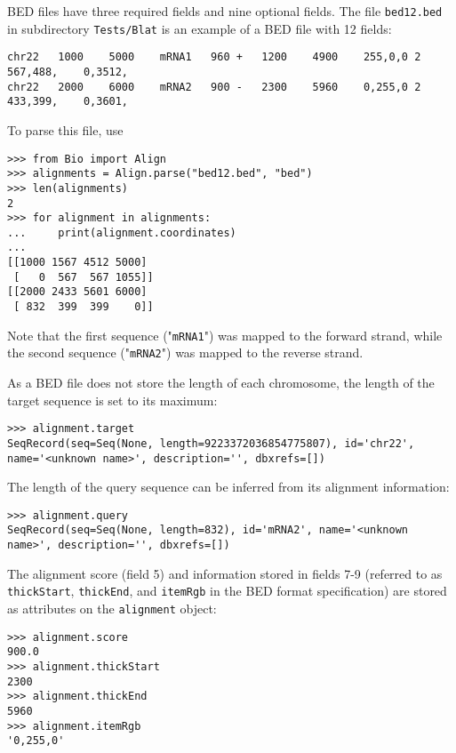 BED files have three required fields and nine optional fields. The file \verb|bed12.bed| in subdirectory \verb|Tests/Blat| is an example of a BED file with 12 fields:
\begin{verbatim}
chr22	1000	5000	mRNA1	960	+	1200	4900	255,0,0	2	567,488,	0,3512,
chr22	2000	6000	mRNA2	900	-	2300	5960	0,255,0	2	433,399,	0,3601,
\end{verbatim}
To parse this file, use
\begin{verbatim}
>>> from Bio import Align
>>> alignments = Align.parse("bed12.bed", "bed")
>>> len(alignments)
2
>>> for alignment in alignments:
...     print(alignment.coordinates)
...
[[1000 1567 4512 5000]
 [   0  567  567 1055]]
[[2000 2433 5601 6000]
 [ 832  399  399    0]]
\end{verbatim}
Note that the first sequence ("\verb|mRNA1|") was mapped to the forward strand, while the second sequence ("\verb|mRNA2|") was mapped to the reverse strand.

As a BED file does not store the length of each chromosome, the length of the target sequence is set to its maximum:
\begin{verbatim}
>>> alignment.target
SeqRecord(seq=Seq(None, length=9223372036854775807), id='chr22', name='<unknown name>', description='', dbxrefs=[])
\end{verbatim}
The length of the query sequence can be inferred from its alignment information:
\begin{verbatim}
>>> alignment.query
SeqRecord(seq=Seq(None, length=832), id='mRNA2', name='<unknown name>', description='', dbxrefs=[])
\end{verbatim}
The alignment score (field 5) and information stored in fields 7-9 (referred to as \verb|thickStart|, \verb|thickEnd|, and \verb|itemRgb| in the BED format specification) are stored as attributes on the \verb|alignment| object:
\begin{verbatim}
>>> alignment.score
900.0
>>> alignment.thickStart
2300
>>> alignment.thickEnd
5960
>>> alignment.itemRgb
'0,255,0'
\end{verbatim}

